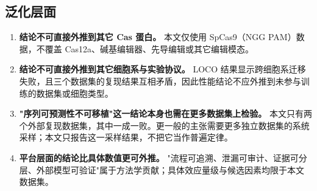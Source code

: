 \subsection{泛化层面}

\begin{enumerate}
\item \textbf{结论不可直接外推到其它 Cas 蛋白。} 本文仅使用 SpCas9（NGG PAM）数据，不覆盖 Cas12a、碱基编辑器、先导编辑或其它编辑模态。
\item \textbf{结论不可直接外推到其它细胞系与实验协议。} LOCO 结果显示跨细胞系迁移失败，且三个数据集的复现结果互相矛盾，因此性能结论不应外推到未参与训练的数据集或细胞类型。
\item \textbf{"序列可预测性不可移植"这一结论本身也需在更多数据集上检验。} 本文只有两个外部复现数据集，其中一成一败。更一般的主张需要更多独立数据集的系统采样；本文只报告这一采样结果，不把它当作普遍定律。
\item \textbf{平台层面的结论比具体数值更可外推。} "流程可追溯、泄漏可审计、证据可分层、外部模型可验证"属于方法学贡献；具体效应量级与候选因素均限于本文数据集。
\end{enumerate}
